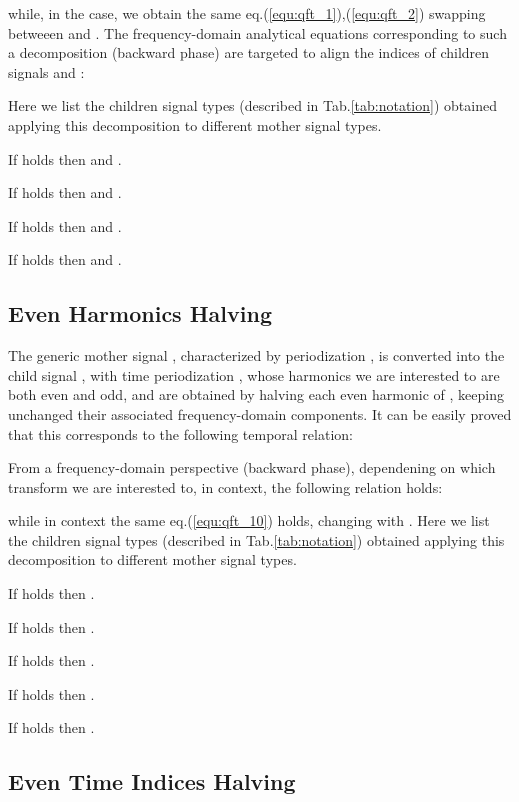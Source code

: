 \documentclass[a4paper,10pt]{article}
\begin{document}
while, in the  case, we obtain the same eq.(\ref{equ:qft_1}),(\ref{equ:qft_2}) swapping betweeen  and .
The frequency-domain analytical equations corresponding to such a decomposition  (backward phase) are
targeted to align the  indices of children signals  and :

Here we list the children signal types (described in Tab.\ref{tab:notation}) obtained applying this decomposition to different mother signal types.

If  holds then  and .

If  holds then  and .

If  holds then  and .

If  holds then  and .










\subsection{Even Harmonics Halving} \label{sec:k_even} 

The generic mother signal , characterized by periodization , is converted into the child signal , with time periodization , whose harmonics we are interested to are both even and odd, and are obtained by halving each even harmonic of  , keeping unchanged their associated frequency-domain components.
It can be easily proved that this corresponds to the following temporal relation:

From a frequency-domain perspective (backward phase), dependening on which transform we are interested to, in  context, the following relation holds:

while in  context the same eq.(\ref{equ:qft_10}) holds, changing  with . 
Here we list the children signal types (described in Tab.\ref{tab:notation}) obtained applying this decomposition to different mother signal types.

If  holds then .

If  holds then .

If  holds then .

If  holds then .

If  holds then .






\subsection{Even Time Indices Halving} \label{sec:n_even} 
\end{document}
